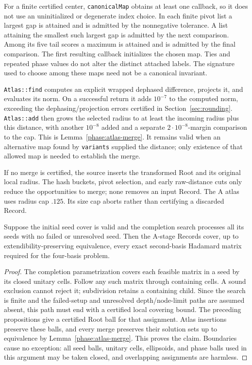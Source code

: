 For a finite certified center, \texttt{canonicalMap} obtains at
least one callback, so it does not use an uninitialized or
degenerate index choice.  In each finite pivot list a largest gap
is attained and is admitted by the nonnegative tolerance.  A list
attaining the smallest such largest gap is admitted by the next
comparison.  Among its five tail scores a maximum is attained
and is admitted by the final comparison.  The first resulting
callback initializes the chosen map.  Ties and repeated phase
values do not alter the distinct attached labels.  The signature
used to choose among these maps need not be a canonical invariant.

\texttt{Atlas::find} computes an explicit wrapped dephased
difference, projects it, and evaluates its norm.  On a successful
return it adds \(10^{-7}\) to the computed norm, exceeding the
dephasing/projection errors certified in
Section~\ref{sec:rounding}.  \texttt{Atlas::add} then grows the
selected radius to at least the incoming radius plus this
distance, with another \(10^{-8}\) added and a separate
\(2\cdot10^{-8}\)-margin comparison to the cap.  This is
Lemma~\ref{phase:atlas-merge}.  It remains valid when an alternative
map found by \texttt{variants} supplied the distance; only existence
of that allowed map is needed to establish the merge.

If no merge is certified, the source inserts the transformed
Root and its original local radius.  The hash buckets, pivot
selection, and early raw-distance cuts only reduce the
opportunities to merge; none removes an input Record.  The A
atlas uses radius cap \(.125\).  Its size cap aborts rather than
certifying a discarded Record.

\begin{proposition}
\label{phase:A-cover}
Suppose the initial seed cover is valid and the completion search
processes all its seeds with no failed or unresolved seed.  Then
the A-stage Records cover, up to extendibility-preserving
equivalence, every exact second-basis Hadamard matrix required
for the four-basis problem.
\end{proposition}

\begin{proof}
The completion parametrization covers each feasible matrix in a
seed by its closed unitary cells.  Follow any such matrix through
containing cells.  A sound exclusion cannot reject it; subdivision
retains a containing child.  Since the search is finite and the
failed-setup and unresolved depth/node-limit paths are assumed
absent, this path must end with a certified local covering bound.
The preceding propositions give a certified Root ball for that
assignment.  Atlas insertions preserve these
balls, and every merge preserves their solution sets up to
equivalence by Lemma~\ref{phase:atlas-merge}.  This proves the
claim.  Boundaries cause no exception: all seed balls, unitary
cells, ellipsoids, and phase balls used in this argument may be
taken closed, and overlapping assignments are harmless.
\end{proof}
